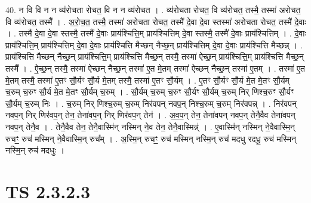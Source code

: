 \documentclass[17pt]{extarticle}
\begin{document}
40. न वि वि न न व्य॑रोचता रोचत॒ वि न न व्य॑रोचत । . व्य॑रोचता रोचत॒ वि व्य॑रोचत॒ तस्मै॒ तस्मा॑ अरोचत॒ वि व्य॑रोचत॒ तस्मै᳚ । . अ॒रो॒च॒त॒ तस्मै॒ तस्मा॑ अरोचता रोचत॒ तस्मै॑ दे॒वा दे॒वा स्तस्मा॑ अरोचता रोचत॒ तस्मै॑ दे॒वाः । . तस्मै॑ दे॒वा दे॒वा स्तस्मै॒ तस्मै॑ दे॒वाः प्राय॑श्चित्ति॒म् प्राय॑श्चित्तिम् दे॒वा स्तस्मै॒ तस्मै॑ दे॒वाः प्राय॑श्चित्तिम् । . दे॒वाः प्राय॑श्चित्ति॒म् प्राय॑श्चित्तिम् दे॒वा दे॒वाः प्राय॑श्चित्ति मैच्छन् नैच्छ॒न् प्राय॑श्चित्तिम् दे॒वा दे॒वाः प्राय॑श्चित्ति मैच्छन्न् । . प्राय॑श्चित्ति मैच्छन् नैच्छ॒न् प्राय॑श्चित्ति॒म् प्राय॑श्चित्ति मैच्छ॒न् तस्मै॒ तस्मा॑ ऐच्छ॒न् प्राय॑श्चित्ति॒म् प्राय॑श्चित्ति मैच्छ॒न् तस्मै᳚ । . ऐ॒च्छ॒न् तस्मै॒ तस्मा॑ ऐच्छन् नैच्छ॒न् तस्मा॑ ए॒त मे॒तम् तस्मा॑ ऐच्छन् नैच्छ॒न् तस्मा॑ ए॒तम् । . तस्मा॑ ए॒त मे॒तम् तस्मै॒ तस्मा॑ ए॒तꣳ सौ॒र्यꣳ सौ॒र्य मे॒तम् तस्मै॒ तस्मा॑ ए॒तꣳ सौ॒र्यम् । . ए॒तꣳ सौ॒र्यꣳ सौ॒र्य मे॒त मे॒तꣳ सौ॒र्यम् च॒रुम् च॒रुꣳ सौ॒र्य मे॒त मे॒तꣳ सौ॒र्यम् च॒रुम् । . सौ॒र्यम् च॒रुम् च॒रुꣳ सौ॒र्यꣳ सौ॒र्यम् च॒रुम् निर् णिश्च॒रुꣳ सौ॒र्यꣳ सौ॒र्यम् च॒रुम् निः । . च॒रुम् निर् णिश्च॒रुम् च॒रुम् निर॑वपन् नवप॒न् निश्च॒रुम् च॒रुम् निर॑वपन्न् । . निर॑वपन् नवप॒न् निर् णिर॑वप॒न् तेन॒ तेना॑वप॒न् निर् णिर॑वप॒न् तेन॑ । . अ॒व॒प॒न् तेन॒ तेना॑वपन् नवप॒न् तेनै॒वैव तेना॑वपन् नवप॒न् तेनै॒व । . तेनै॒वैव तेन॒ तेनै॒वास्मि॑न् नस्मिन् ने॒व तेन॒ तेनै॒वास्मिन्न्॑ । . ए॒वास्मि॑न् नस्मिन् ने॒वैवास्मि॒न् रुचꣳ॒॒ रुच॑ मस्मिन् ने॒वैवास्मि॒न् रुच᳚म् । . अ॒स्मि॒न् रुचꣳ॒॒ रुच॑ मस्मिन् नस्मि॒न् रुच॑ मदधु रदधू॒ रुच॑ मस्मिन् नस्मि॒न् रुच॑ मदधुः । \newline
\pagebreak
{}
\section*{ TS 2.3.2.3 }
\end{document}
